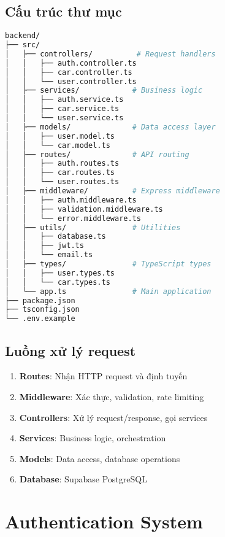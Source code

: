 \documentclass[12pt,a4paper]{article}
\begin{document}
\subsection{Cấu trúc thư mục}
\begin{lstlisting}[language=bash, caption=Cấu trúc project backend]
backend/
├── src/
│   ├── controllers/          # Request handlers
│   │   ├── auth.controller.ts
│   │   ├── car.controller.ts
│   │   └── user.controller.ts
│   ├── services/            # Business logic
│   │   ├── auth.service.ts
│   │   ├── car.service.ts
│   │   └── user.service.ts
│   ├── models/              # Data access layer
│   │   ├── user.model.ts
│   │   └── car.model.ts
│   ├── routes/              # API routing
│   │   ├── auth.routes.ts
│   │   ├── car.routes.ts
│   │   └── user.routes.ts
│   ├── middleware/          # Express middleware
│   │   ├── auth.middleware.ts
│   │   ├── validation.middleware.ts
│   │   └── error.middleware.ts
│   ├── utils/               # Utilities
│   │   ├── database.ts
│   │   ├── jwt.ts
│   │   └── email.ts
│   ├── types/               # TypeScript types
│   │   ├── user.types.ts
│   │   └── car.types.ts
│   └── app.ts               # Main application
├── package.json
├── tsconfig.json
└── .env.example
\end{lstlisting}

\subsection{Luồng xử lý request}
\begin{enumerate}
    \item \textbf{Routes}: Nhận HTTP request và định tuyến
    \item \textbf{Middleware}: Xác thực, validation, rate limiting
    \item \textbf{Controllers}: Xử lý request/response, gọi services
    \item \textbf{Services}: Business logic, orchestration
    \item \textbf{Models}: Data access, database operations
    \item \textbf{Database}: Supabase PostgreSQL
\end{enumerate}

\section{Authentication System}
\end{document}
